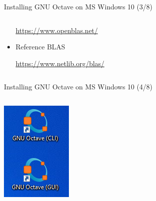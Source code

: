 \begin{frame}{Installing GNU Octave on MS Windows 10 (3/8)}
\begin{columns}
\begin{column}{0.5\textwidth}
\begin{itemize}
{\footnotesize \url{https://www.openblas.net/}}

\item
{\color{DarkBlue}Reference BLAS}

{\footnotesize \url{https://www.netlib.org/blas/}}
\end{itemize}
\end{column}
\end{columns}
\end{frame}



\begin{frame}{Installing GNU Octave on MS Windows 10 (4/8)}
\begin{columns}
\begin{column}{0.2\textwidth}
\includegraphics[width=\textwidth]{res/ms_windows/win_install_desktop_icons.png}
\end{column}
\begin{column}{0.3\textwidth}

\end{column}
\end{columns}
\end{frame}
